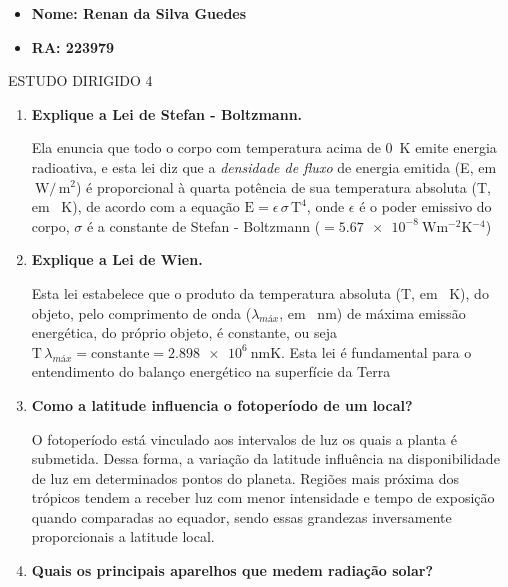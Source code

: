\documentclass[a4paper, 12pt]{article}
\newcommand{\tbf}[1]{\textbf{#1}}
\begin{document}
	\begin{itemize}
		\item\textbf{Nome: Renan da Silva Guedes}
		\item\textbf{RA: 223979}
	\end{itemize}
	
	\begin{center}
		\begin{large}
			\uppercase{Estudo dirigido 4}
		\end{large}
	\end{center}
	
	\begin{enumerate}
		\item\tbf{Explique a Lei de Stefan - Boltzmann.}
		
		Ela enuncia que todo o corpo com temperatura acima de \SI{0}{\kelvin} emite energia radioativa, e esta lei diz que a \textit{densidade de fluxo} de energia emitida (E, em $\SI{}{\watt/\,\meter^{2}}$) é proporcional  à quarta potência de sua temperatura absoluta (T, em \SI{}{\kelvin}), de acordo com a equação $\textrm{E}=\epsilon\,\sigma\,\textrm{T}^{4}$, onde $\epsilon$ é o poder emissivo do corpo, $\sigma$ é a constante de Stefan - Boltzmann ($=\SI{5.67e-8}{\watt\meter^{-2}\kelvin^{-4}}$)
		
		\item\tbf{Explique a Lei de Wien.}
		
		Esta lei estabelece que o produto da temperatura absoluta (T, em \SI{}{\kelvin}), do objeto, pelo comprimento de onda ($\lambda_{\textit{máx}}$, em \SI{}{\nano\meter}) de máxima emissão energética, do próprio objeto, é constante, ou seja $\textrm{T}\,\lambda_{\textit{máx}}=\textrm{constante}=\SI{2.898e6}{\nano\meter\kelvin}$. Esta lei é fundamental para o entendimento do balanço energético na superfície da Terra
		
		\item\tbf{Como a latitude influencia o fotoperíodo de um local?}
		
		O fotoperíodo está vinculado aos intervalos de luz os quais a planta é submetida. Dessa forma, a variação da latitude influência na disponibilidade de luz em determinados pontos do planeta. Regiões mais próxima dos trópicos tendem a receber luz com menor intensidade e tempo de exposição quando comparadas ao equador, sendo essas grandezas inversamente proporcionais a latitude local.
		
		\item\tbf{Quais os principais aparelhos que medem radiação solar?}
		

\end{enumerate}
\end{document}
